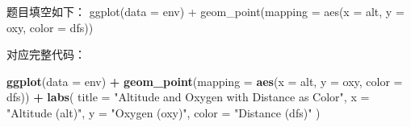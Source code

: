 \documentclass[
]{article}
\newenvironment{Shaded}{\begin{snugshade}}{\end{snugshade}}
\newcommand{\AttributeTok}[1]{\textcolor[rgb]{0.13,0.29,0.53}{#1}}
\newcommand{\FunctionTok}[1]{\textcolor[rgb]{0.13,0.29,0.53}{\textbf{#1}}}
\newcommand{\NormalTok}[1]{#1}
\newcommand{\SpecialCharTok}[1]{\textcolor[rgb]{0.81,0.36,0.00}{\textbf{#1}}}
\newcommand{\StringTok}[1]{\textcolor[rgb]{0.31,0.60,0.02}{#1}}
\begin{document}
题目填空如下： ggplot(data = env) + geom\_point(mapping = aes(x = alt, y
= oxy, color = dfs))

对应完整代码：

\begin{Shaded}
\begin{Highlighting}[]
\FunctionTok{ggplot}\NormalTok{(}\AttributeTok{data =}\NormalTok{ env) }\SpecialCharTok{+}
  \FunctionTok{geom\_point}\NormalTok{(}\AttributeTok{mapping =} \FunctionTok{aes}\NormalTok{(}\AttributeTok{x =}\NormalTok{ alt, }\AttributeTok{y =}\NormalTok{ oxy, }\AttributeTok{color =}\NormalTok{ dfs)) }\SpecialCharTok{+}
  \FunctionTok{labs}\NormalTok{(}
    \AttributeTok{title =} \StringTok{"Altitude and Oxygen with Distance as Color"}\NormalTok{,}
    \AttributeTok{x =} \StringTok{"Altitude (alt)"}\NormalTok{,}
    \AttributeTok{y =} \StringTok{"Oxygen (oxy)"}\NormalTok{,}
    \AttributeTok{color =} \StringTok{"Distance (dfs)"}
\NormalTok{  )}
\end{Highlighting}
\end{Shaded}
\end{document}
